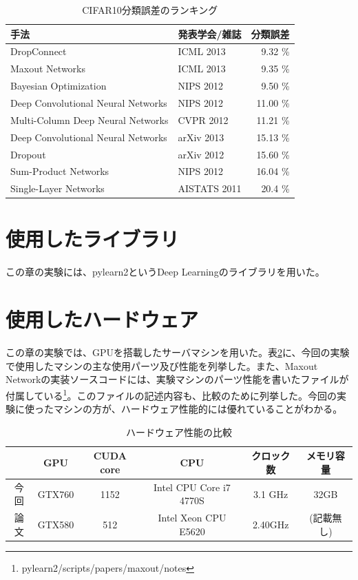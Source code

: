 \begin{table}[tbp]
 \begin{center}
  \begin{tabular}{|l|l|r|}\hline
  手法 & 発表学会/雑誌 & 分類誤差 \\ \hline
DropConnect \cite{wan2013regularization}& ICML 2013 & 9.32 \% \\ \hline
Maxout Networks \cite{goodfellow2013maxout}& ICML 2013 & 9.35 \% \\ \hline
Bayesian Optimization \cite{snoek2012practical}& NIPS 2012 & 9.50 \% \\ \hline
Deep Convolutional Neural Networks \cite{krizhevsky2012imagenet}& NIPS 2012 & 11.00 \% \\ \hline
Multi-Column Deep Neural Networks \cite{ciresan2012multi-column}& CVPR 2012 & 11.21 \% \\ \hline
Deep Convolutional Neural Networks \cite{zeiler2013stochastic}& arXiv 2013 & 15.13 \% \\ \hline
Dropout \cite{hinton2012improving}& arXiv 2012 & 15.60 \% \\ \hline
Sum-Product Networks \cite{gens2012discriminative}& NIPS 2012 & 16.04 \% \\ \hline
Single-Layer Networks \cite{coates2011an-analysis}& AISTATS 2011 & 20.4 \% \\ \hline
  \end{tabular}
 \end{center}
 \caption{CIFAR10分類誤差のランキング}
 \label{c5_cifar_ex}
\end{table}

\section{使用したライブラリ}
この章の実験には、pylearn2というDeep Learningのライブラリを用いた。
\section{使用したハードウェア}
この章の実験では、GPUを搭載したサーバマシンを用いた。表\ref{c5_hardware_spec}に、今回の実験で使用したマシンの主な使用パーツ及び性能を列挙した。また、Maxout Networkの実装ソースコードには、実験マシンのパーツ性能を書いたファイルが付属している\footnote{pylearn2/scripts/papers/maxout/notes}。このファイルの記述内容も、比較のために列挙した。今回の実験に使ったマシンの方が、ハードウェア性能的には優れていることがわかる。
\begin{table}[tbp]
 \begin{center}
  \begin{tabular}{|c|c|c|c|c|c|}\hline
   & GPU & CUDA core & CPU & クロック数 & メモリ容量\\ \hline
今回 & GTX760 & 1152 & Intel CPU Core i7 4770S & 3.1 GHz & 32GB\\ \hline
論文 & GTX580 & 512 & Intel Xeon CPU E5620 &  2.40GHz & (記載無し)\\ \hline
  \end{tabular}
 \end{center}
 \caption{ハードウェア性能の比較}
 \label{c5_hardware_spec}
\end{table}

